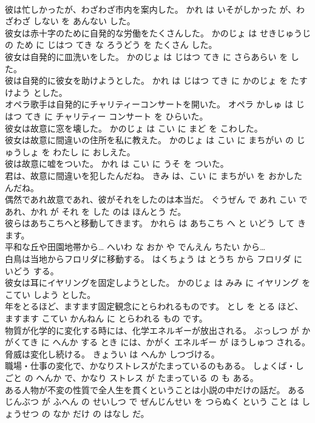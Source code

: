 \documentclass[8pt]{extreport}
\begin{document}
\begin{CJK}{UTF8}{min}
\\	彼は忙しかったが、わざわざ市内を案内した。	かれ は いそがしかった が、わざわざ しない を あんない した。	
\\	彼女は赤十字のために自発的な労働をたくさんした。	かのじょ は せきじゅうじ の ため に じはつ てき な ろうどう を たくさん した。	
\\	彼女は自発的に皿洗いをした。	かのじょ は じはつ てき に さらあらい を した。	
\\	彼は自発的に彼女を助けようとした。	かれ は じはつ てき に かのじょ を たすけよう とした。	
\\	オペラ歌手は自発的にチャリティーコンサートを開いた。	オペラ かしゅ は じはつ てき に チャリティー コンサート を ひらいた。	
\\	彼女は故意に窓を壊した。	かのじょ は こい に まど を こわした。	
\\	彼女は故意に間違いの住所を私に教えた。	かのじょ は こい に まちがい の じゅうしょ を わたし に おしえた。	
\\	彼は故意に嘘をついた。	かれ は こい に うそ を ついた。	
\\	君は、故意に間違いを犯したんだね。	きみ は、こい に まちがい を おかした んだね。	
\\	偶然であれ故意であれ、彼がそれをしたのは本当だ。	ぐうぜん で あれ こい で あれ、かれ が それ を した のは ほんとう だ。	
\\	彼らはあちこちへと移動してきます。	かれら は あちこち へ と いどう して きます。	
\\	平和な丘や田園地帯から…	へいわ な おか や でんえん ちたい から…	
\\	白鳥は当地からフロリダに移動する。	はくちょう は とうち から フロリダ に いどう する。	
\\	彼女は耳にイヤリングを固定しようとした。	かのじょ は みみ に イヤリング を こてい しよう とした。	
\\	年をとるほど、ますます固定観念にとらわれるものです。	とし を とる ほど、ますます こてい かんねん に とらわれる もの です。	
\\	物質が化学的に変化する時には、化学エネルギーが放出される。	ぶっしつ が かがくてき に へんか する とき には、かがく エネルギー が ほうしゅつ される。	
\\	脅威は変化し続ける。	きょうい は へんか しつづける。	
\\	職場・仕事の変化で、かなりストレスがたまっているのもある。	しょくば・しごと の へんか で、かなり ストレス が たまっている の も ある。	
\\	ある人物が不変の性質で全人生を貫くということは小説の中だけの話だ。	ある じんぶつ が ふへん の せいしつ で ぜんじんせい を つらぬく という こと は しょうせつ の なか だけ の はなし だ。	

\end{CJK}
\end{document}
